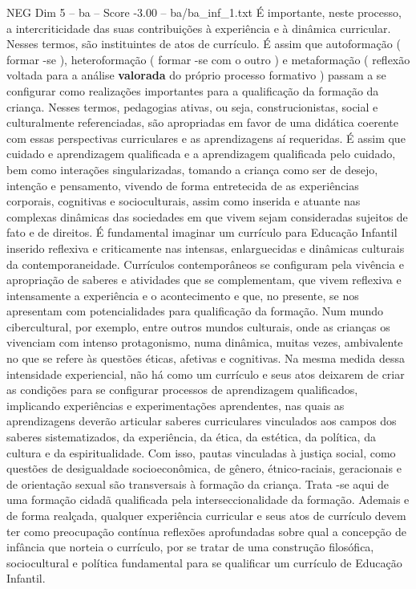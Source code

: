 \begin{textsample}{NEG Dim 5 – ba – Score -3.00 – ba/ba\_inf\_1.txt}
É importante, neste processo, a intercriticidade das suas contribuições à experiência e à dinâmica curricular.
Nesses termos, são instituintes de atos de currículo.
É assim que autoformação ( formar -se ), heteroformação ( formar -se com o outro ) e metaformação ( reflexão voltada para a análise \textbf{valorada} do próprio processo formativo ) passam a se configurar como realizações importantes para a qualificação da formação da criança.
Nesses termos, pedagogias ativas, ou seja, construcionistas, social e culturalmente referenciadas, são apropriadas em favor de uma didática coerente com essas perspectivas curriculares e as aprendizagens aí requeridas.
É assim que cuidado e aprendizagem qualificada e a aprendizagem qualificada pelo cuidado, bem como interações singularizadas, tomando a criança como ser de desejo, intenção e pensamento, vivendo de forma entretecida de as experiências corporais, cognitivas e socioculturais, assim como inserida e atuante nas complexas dinâmicas das sociedades em que vivem sejam consideradas sujeitos de fato e de direitos.
É fundamental imaginar um currículo para Educação Infantil inserido reflexiva e criticamente nas intensas, enlarguecidas e dinâmicas culturais da contemporaneidade.
Currículos contemporâneos se configuram pela vivência e apropriação de saberes e atividades que se complementam, que vivem reflexiva e intensamente a experiência e o acontecimento e que, no presente, se nos apresentam com potencialidades para qualificação da formação.
Num mundo cibercultural, por exemplo, entre outros mundos culturais, onde as crianças os vivenciam com intenso protagonismo, numa dinâmica, muitas vezes, ambivalente no que se refere às questões éticas, afetivas e cognitivas.
Na mesma medida dessa intensidade experiencial, não há como um currículo e seus atos deixarem de criar as condições para se configurar processos de aprendizagem qualificados, implicando experiências e experimentações aprendentes, nas quais as aprendizagens deverão articular saberes curriculares vinculados aos campos dos saberes sistematizados, da experiência, da ética, da estética, da política, da cultura e da espiritualidade.
Com isso, pautas vinculadas à justiça social, como questões de desigualdade socioeconômica, de gênero, étnico-raciais, geracionais e de orientação sexual são transversais à formação da criança.
Trata -se aqui de uma formação cidadã qualificada pela interseccionalidade da formação.
Ademais e de forma realçada, qualquer experiência curricular e seus atos de currículo devem ter como preocupação contínua reflexões aprofundadas sobre qual a concepção de infância que norteia o currículo, por se tratar de uma construção filosófica, sociocultural e política fundamental para se qualificar um currículo de Educação Infantil.

\end{textsample}
